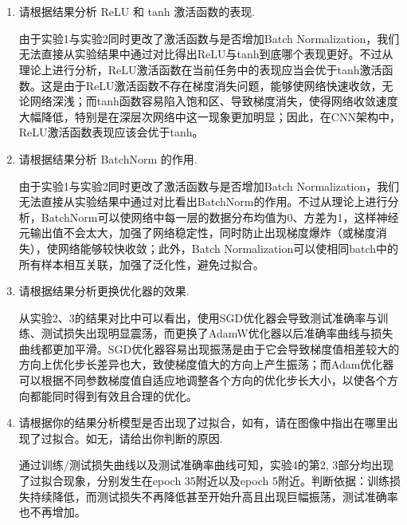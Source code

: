 \documentclass[11pt, a4paper]{article}
\begin{document}
\section{}
\begin{enumerate}
    \item 请根据结果分析 ReLU 和 tanh 激活函数的表现.
    
    由于实验1与实验2同时更改了激活函数与是否增加Batch Normalization，我们无法直接从实验结果中通过对比得出ReLU与tanh到底哪个表现更好。不过从理论上进行分析，ReLU激活函数在当前任务中的表现应当会优于tanh激活函数。这是由于ReLU激活函数不存在梯度消失问题，能够使网络快速收敛，无论网络深浅；而tanh函数容易陷入饱和区、导致梯度消失，使得网络收敛速度大幅降低，特别是在深层次网络中这一现象更加明显；因此，在CNN架构中，ReLU激活函数表现应该会优于tanh。

    \item 请根据结果分析 BatchNorm 的作用.
    
    由于实验1与实验2同时更改了激活函数与是否增加Batch Normalization，我们无法直接从实验结果中通过对比看出BatchNorm的作用。不过从理论上进行分析，BatchNorm可以使网络中每一层的数据分布均值为0、方差为1，这样神经元输出值不会太大，加强了网络稳定性，同时防止出现梯度爆炸（或梯度消失），使网络能够较快收敛；此外，Batch Normalization可以使相同batch中的所有样本相互关联，加强了泛化性，避免过拟合。

    \item 请根据结果分析更换优化器的效果.
    
    从实验2、3的结果对比中可以看出，使用SGD优化器会导致测试准确率与训练、测试损失出现明显震荡，而更换了AdamW优化器以后准确率曲线与损失曲线都更加平滑。SGD优化器容易出现振荡是由于它会导致梯度值相差较大的方向上优化步长差异也大，致使梯度值大的方向上产生振荡；而Adam优化器可以根据不同参数梯度值自适应地调整各个方向的优化步长大小，以使各个方向都能同时得到有效且合理的优化。

    \item 请根据你的结果分析模型是否出现了过拟合，如有，请在图像中指出在哪里出现了过拟合。如无，请给出你判断的原因.
    
    通过训练/测试损失曲线以及测试准确率曲线可知，实验4的第2, 3部分均出现了过拟合现象，分别发生在epoch 35附近以及epoch 5附近。判断依据：训练损失持续降低，而测试损失不再降低甚至开始升高且出现巨幅振荡，测试准确率也不再增加。

\end{enumerate}
\end{document}
